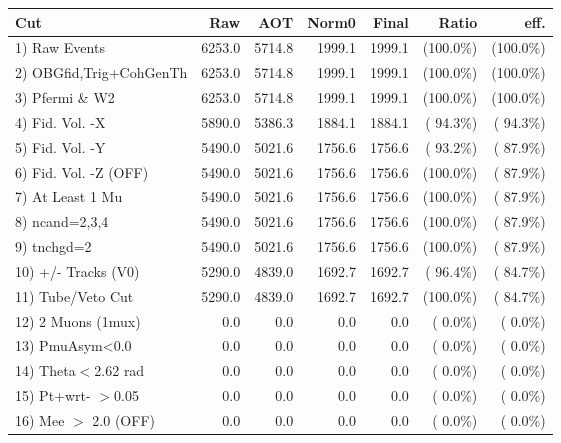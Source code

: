  \begin{table}[h!]\centering
 \begin{tabular}{||l||r|r|r|r|r|r||}
 \hline
 \hline
 Cut & Raw & AOT & Norm0 & Final & Ratio & eff.       \\
 \hline
  1) Raw Events           &       6253.0 &       5714.8 &       1999.1 &       1999.1 & (100.0\%) & (100.0\%) \\
  2) OBGfid,Trig+CohGenTh &       6253.0 &       5714.8 &       1999.1 &       1999.1 & (100.0\%) & (100.0\%) \\
  3) Pfermi \& W2         &       6253.0 &       5714.8 &       1999.1 &       1999.1 & (100.0\%) & (100.0\%) \\
  4) Fid. Vol. -X         &       5890.0 &       5386.3 &       1884.1 &       1884.1 & ( 94.3\%) & ( 94.3\%) \\
  5) Fid. Vol. -Y         &       5490.0 &       5021.6 &       1756.6 &       1756.6 & ( 93.2\%) & ( 87.9\%) \\
  6) Fid. Vol. -Z (OFF)   &       5490.0 &       5021.6 &       1756.6 &       1756.6 & (100.0\%) & ( 87.9\%) \\
  7) At Least 1 Mu        &       5490.0 &       5021.6 &       1756.6 &       1756.6 & (100.0\%) & ( 87.9\%) \\
  8) ncand=2,3,4          &       5490.0 &       5021.6 &       1756.6 &       1756.6 & (100.0\%) & ( 87.9\%) \\
  9) tnchgd=2             &       5490.0 &       5021.6 &       1756.6 &       1756.6 & (100.0\%) & ( 87.9\%) \\
 10) +/- Tracks (V0)      &       5290.0 &       4839.0 &       1692.7 &       1692.7 & ( 96.4\%) & ( 84.7\%) \\
 11) Tube/Veto Cut        &       5290.0 &       4839.0 &       1692.7 &       1692.7 & (100.0\%) & ( 84.7\%) \\
 12) 2 Muons (1mux)       &          0.0 &          0.0 &          0.0 &          0.0 & (  0.0\%) & (  0.0\%) \\
 13) PmuAsym<0.0          &          0.0 &          0.0 &          0.0 &          0.0 & (  0.0\%) & (  0.0\%) \\
 14) Theta$<$2.62 rad     &          0.0 &          0.0 &          0.0 &          0.0 & (  0.0\%) & (  0.0\%) \\
 15) Pt+wrt- $>$0.05      &          0.0 &          0.0 &          0.0 &          0.0 & (  0.0\%) & (  0.0\%) \\
 16) Mee $>$ 2.0  (OFF)   &          0.0 &          0.0 &          0.0 &          0.0 & (  0.0\%) & (  0.0\%) \\

\end{tabular}
\end{table}
